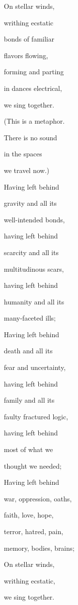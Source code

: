 
On stellar winds,

writhing ecstatic

bonds of familiar

flavors flowing,

forming and parting

in dances electrical,

we sing together.

(This is a metaphor.

There is no sound

in the spaces

we travel now.)

Having left behind

gravity and all its

well-intended bonds,

having left behind

scarcity and all its

multitudinous scars,

having left behind

humanity and all its

many-faceted ills;

Having left behind

death and all its

fear and uncertainty,

having left behind

family and all its

faulty fractured logic,

having left behind

most of what we

thought we needed;

Having left behind

war, oppression, oaths,

faith, love, hope,

terror, hatred, pain,

memory, bodies, brains;

On stellar winds,

writhing ecstatic,

we sing together.
